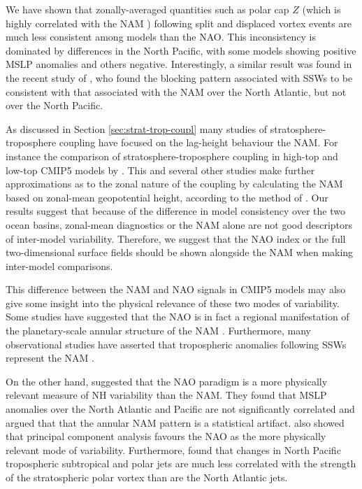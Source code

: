 We have shown that zonally-averaged quantities such as polar cap $Z$ (which is
highly correlated with the NAM \citep{Kushner2010}) following split and
displaced vortex events are much less consistent among models than the NAO. This
inconsistency is dominated by differences in the North Pacific, with some models
showing positive MSLP anomalies and others negative. Interestingly, a similar
result was found in the recent study of \citet{Davini2014}, who found the
blocking pattern associated with SSWs to be consistent with that associated with
the NAM over the North Atlantic, but not over the North Pacific. 

As discussed in Section \ref{sec:strat-trop-coupl} many studies of
stratosphere-troposphere coupling have focused on the lag-height behaviour the
NAM. For instance the comparison of stratosphere-troposphere coupling in
high-top and low-top CMIP5 models by \citet{Charlton-Perez2013}. This and
several other studies make further approximations as to the zonal nature of the
coupling by calculating the NAM based on zonal-mean geopotential height,
according to the method of \citet{Baldwin2009}. Our results suggest that because
of the difference in model consistency over the two ocean basins, zonal-mean
diagnostics or the NAM alone are not good descriptors of inter-model
variability. Therefore, we suggest that the NAO index or the full
two-dimensional surface fields should be shown alongside the NAM when making
inter-model comparisons.

This difference between the NAM and NAO signals in CMIP5 models may also give
some insight into the physical relevance of these two modes of variability. Some
studies have suggested that the NAO is in fact a regional manifestation of the
planetary-scale annular structure of the NAM \citep[e.g.,][]{Thompson1998,
  Wallace2002}. Furthermore, many observational studies have asserted that
tropospheric anomalies following SSWs represent the NAM
\citep[e.g.,][]{Baldwin1999,Baldwin2001a,Thompson2000}. 

On the other hand, \citet{Ambaum2001} suggested that the NAO paradigm is a more
physically relevant measure of NH variability than the NAM. They found that MSLP
anomalies over the North Atlantic and Pacific are not significantly correlated
and argued that that the annular NAM pattern is a statistical
artifact. \citet{Huth2006} also showed that principal component analysis favours
the NAO as the more physically relevant mode of variability. Furthermore,
\citet{Ambaum2002} found that changes in North Pacific tropospheric subtropical
and polar jets are much less correlated with the strength of the stratospheric
polar vortex than are the North Atlantic jets.

